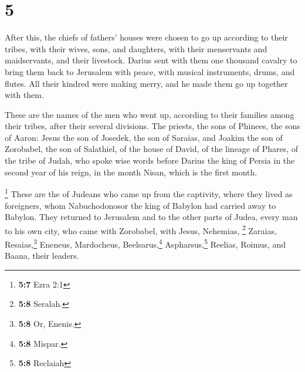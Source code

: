 \hypertarget{section-4}{%
\section{5}\label{section-4}}

 After this, the chiefs of fathers' houses were chosen to
go up according to their tribes, with their wives, sons, and daughters,
with their menservants and maidservants, and their livestock.
 Darius sent with them one thousand cavalry to bring them
back to Jerusalem with peace, with musical instruments, drums, and
flutes.  All their kindred were making merry, and he made
them go up together with them.

 These are the names of the men who went up, according to
their families among their tribes, after their several divisions.
 The priests, the sons of Phinees, the sons of Aaron:
Jesus the son of Josedek, the son of Saraias, and Joakim the son of
Zorobabel, the son of Salathiel, of the house of David, of the lineage
of Phares, of the tribe of Judah,  who spoke wise words
before Darius the king of Persia in the second year of his reign, in the
month Nisan, which is the first month.

 \footnote{\textbf{5:7} Ezra 2:1} These are the of Judeans
who came up from the captivity, where they lived as foreigners, whom
Nabuchodonosor the king of Babylon had carried away to Babylon.
 They returned to Jerusalem and to the other parts of
Judea, every man to his own city, who came with Zorobabel, with Jesus,
Nehemias, \footnote{\textbf{5:8} Seralah.} Zaraias, Resaias,\footnote{\textbf{5:8}
  Or, Enenis.} Eneneus, Mardocheus, Beelsarus,\footnote{\textbf{5:8}
  Mispar.} Aspharsus,\footnote{\textbf{5:8} Reclaiah} Reelias, Roimus,
and Baana, their leaders.

